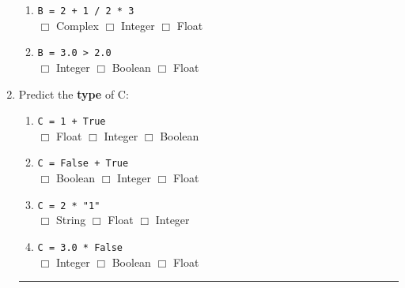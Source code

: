 \documentclass[11pt]{report}
\begin{document}
\begin{enumerate}
\begin{enumerate}
        \item {\tt B = 2 + 1 / 2 * 3}\\
        $\Box$ Complex \hspace{3em} $\Box$ Integer \hspace{3em} $\Box$ Float \\

        \item {\tt B = 3.0 > 2.0}\\
        $\Box$ Integer \hspace{3em} $\Box$ Boolean \hspace{3em} $\Box$ Float \\
    \end{enumerate}

    \item Predict the \textbf{type} of C:

    \begin{enumerate}
        \item {\tt C = 1 + True}\\
        $\Box$ Float \hspace{3em} $\Box$ Integer \hspace{3em} $\Box$ Boolean \hspace{3em} \\

        \item {\tt C = False + True}\\
        $\Box$ Boolean \hspace{3em} $\Box$ Integer \hspace{3em} $\Box$ Float \\

        \item {\tt C = 2 * "1"}\\
        $\Box$ String \hspace{3em} $\Box$ Float \hspace{3em} $\Box$ Integer \\

        \item {\tt C = 3.0 * False}\\
        $\Box$ Integer \hspace{3em} $\Box$ Boolean \hspace{3em} $\Box$ Float \\
    \end{enumerate}

    \vspace{2em}
    \hrule
    \vspace{1em}

\end{enumerate}
\end{document}

